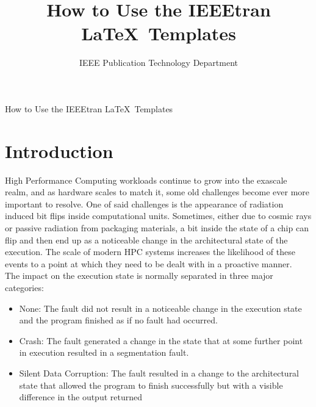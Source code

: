 \documentclass[lettersize,journal]{IEEEtran}
\begin{document}
\title{How to Use the IEEEtran \LaTeX \ Templates}
\author{IEEE Publication Technology Department}

%
{How to Use the IEEEtran \LaTeX \ Templates}

\maketitle

\begin{abstract}

\end{abstract}

\begin{IEEEkeywords}

\end{IEEEkeywords}


\section{Introduction}
 High Performance Computing workloads continue to grow into the exascale realm, and as hardware scales to match it, some old challenges become ever more important to resolve. One of said challenges is the appearance of radiation induced bit flips inside computational units. Sometimes, either due to cosmic rays or passive radiation from packaging materials, a bit inside the state of a chip can flip and then end up as a noticeable change in the architectural state of the execution.\cite{dodd2003basic,doi:10.1126/science.206.4420.776} The scale of modern HPC systems increases the likelihood of these events to a point at which they need to be dealt with in a proactive manner.\cite{geist2016supercomputing,snir2014addressing,dongarra2015fault} \\
The impact on the execution state is normally separated in three major categories:\cite{avizienis2004basic}
\begin{itemize}
    \item None: The fault did not result in a noticeable change in
the execution state and the program finished as if no fault
had occurred.
\item Crash: The fault generated a change in the state that at
some further point in execution resulted in a segmentation
fault.
\item Silent Data Corruption: The fault resulted in a change to
the architectural state that allowed the program to finish
successfully but with a visible difference in the output
returned
\end{itemize}
\end{document}
